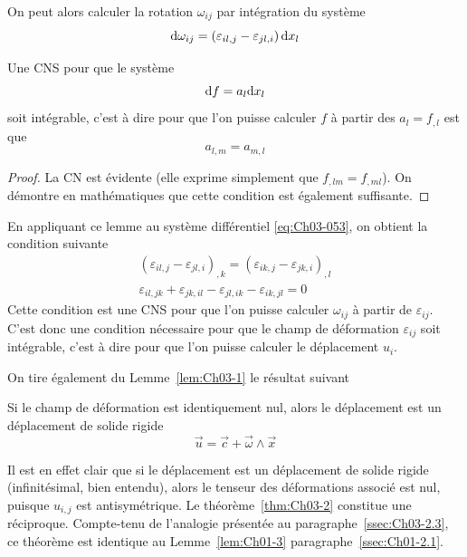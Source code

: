 On peut alors calculer la rotation $\omega_{ij}$ par intégration du système
\begin{equation}
    \mathrm{d} \omega_{ij} = \left( \varepsilon_{il,j} - \varepsilon_{jl,i} \right) \mathrm{d} x_l
    \label{eq:Ch03-053}
\end{equation}
\begin{lem} \label{lem:Ch03-2}
    Une CNS pour que le système 
    \begin{equation}
        \mathrm{d} f = a_l \mathrm{d} x_l
        \label{eq:Ch03-054}
    \end{equation}
    soit intégrable, c'est à dire pour que l'on puisse calculer $f$ à partir des $a_l = f_{,l}$ est que 
    \begin{equation}
        a_{l,m} = a_{m,l}
        \label{eq:Ch03-055}
    \end{equation}
\end{lem}
\begin{proof}
    La CN est évidente (elle exprime simplement que $f_{,lm} = f_{,ml}$).
    On démontre en mathématiques que cette condition est également suffisante.
\end{proof}

En appliquant ce lemme au système différentiel \eqref{eq:Ch03-053}, on obtient la condition suivante
\begin{equation}
    \begin{aligned}
        \left( \varepsilon_{il,j} -\varepsilon_{jl,i} \right)_{,k} = \left( \varepsilon_{ik,j} - \varepsilon_{jk,i} \right)_{,l} \\
        \varepsilon_{il,jk} + \varepsilon_{jk,il} - \varepsilon_{jl,ik} - \varepsilon_{ik,jl} = 0
    \end{aligned}
    \label{eq:Ch03-056}
\end{equation}
Cette condition est une CNS pour que l'on puisse calculer $\omega_{ij}$ à partir de $\varepsilon_{ij}$.
C'est donc une condition nécessaire pour que le champ de déformation $\varepsilon_{ij}$ soit intégrable, c'est à dire pour que l'on puisse calculer le déplacement $u_i$.

On tire également du Lemme~\ref{lem:Ch03-1} le résultat suivant
\begin{thm} \label{thm:Ch03-2}
    Si le champ de déformation est identiquement nul, alors le déplacement est un déplacement de solide rigide 
    \begin{equation}
        \vec{u} = \vec{c} + \vec{\omega} \wedge \vec{x}
        \label{eq:Ch03-057}
    \end{equation}
\end{thm}
Il est en effet clair que si le déplacement est un déplacement de solide rigide (infinitésimal, bien entendu), alors le tenseur des déformations associé est nul, puisque $u_{i,j}$ est antisymétrique.
Le théorème~\ref{thm:Ch03-2} constitue une réciproque.
Compte-tenu de l'analogie présentée au paragraphe~\ref{ssec:Ch03-2.3}, ce théorème est identique au Lemme~\ref{lem:Ch01-3} paragraphe~\ref{ssec:Ch01-2.1}.

